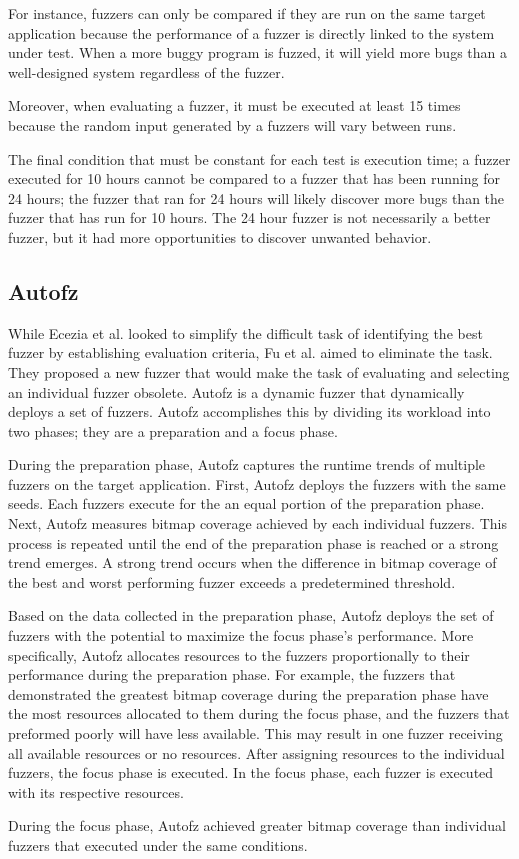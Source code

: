 For instance, fuzzers can only be compared if they are run on the same target application because 
the performance of a fuzzer is directly linked to the system under test. When a more buggy program 
is fuzzed, it will yield more bugs than a well-designed system regardless of the fuzzer. 

Moreover, when evaluating a fuzzer, it must be executed at least 15 times because the random input 
generated by a fuzzers will vary between runs.

The final condition that must be constant for each test is execution time; a fuzzer executed for 
10 hours cannot be compared to a fuzzer that has been running for 24 hours; the fuzzer that ran for 
24 hours will likely discover more bugs than the fuzzer that has run for 10 hours. The 24 hour fuzzer 
is not necessarily a better fuzzer, but it had more opportunities to discover unwanted behavior. 
\cite{eceiza_improving_2023}

\subsection{Autofz}
While Ecezia et al. looked to simplify the difficult task of identifying the best fuzzer by establishing 
evaluation criteria, Fu et al.\cite{fu_autofz_2023} aimed to eliminate the task. They proposed a new fuzzer that would make 
the task of evaluating and selecting an individual fuzzer obsolete. Autofz is a dynamic fuzzer that 
dynamically deploys a set of fuzzers. Autofz accomplishes this by dividing its workload into two phases; 
they are a preparation and a focus phase.

During the preparation phase, Autofz captures the runtime trends of multiple fuzzers on the target 
application. First, Autofz deploys the fuzzers with the same seeds. Each fuzzers execute for the an equal 
portion of the preparation phase. Next, Autofz measures bitmap coverage achieved by each individual fuzzers. 
This process is repeated until the end of the preparation phase is reached or a strong trend emerges. A 
strong trend occurs when the difference in bitmap coverage of the best and worst performing fuzzer exceeds 
a predetermined threshold.

Based on the data collected in the preparation phase, Autofz deploys the set of fuzzers with the potential 
to maximize the focus phase’s performance. More specifically, Autofz allocates resources to the fuzzers 
proportionally to their performance during the preparation phase. For example, the fuzzers that demonstrated 
the greatest bitmap coverage during the preparation phase have the most resources allocated to them during 
the focus phase, and the fuzzers that preformed poorly will have less available. This may result in one 
fuzzer receiving all available resources or no resources. After assigning resources to the individual fuzzers, 
the focus phase is executed. In the focus phase, each fuzzer is executed with its respective resources.

During the focus phase, Autofz achieved greater bitmap coverage than individual fuzzers that executed under 
the same conditions. \cite{fu_autofz_2023}
